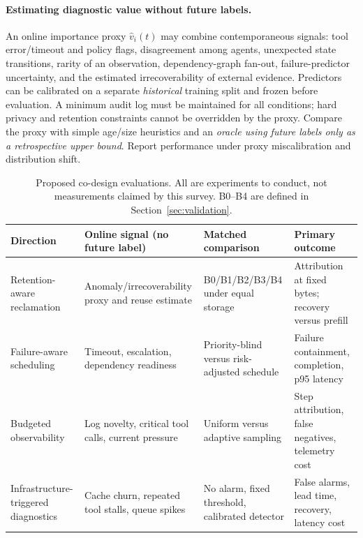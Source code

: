 \paragraph*{Estimating diagnostic value without future labels.} An online importance proxy $\hat v_i(t)$ may combine contemporaneous signals: tool error/timeout and policy flags, disagreement among agents, unexpected state transitions, rarity of an observation, dependency-graph fan-out, failure-predictor uncertainty, and the estimated irrecoverability of external evidence. Predictors can be calibrated on a separate \emph{historical} training split and frozen before evaluation. A minimum audit log must be maintained for all conditions; hard privacy and retention constraints cannot be overridden by the proxy. Compare the proxy with simple age/size heuristics and an \emph{oracle using future labels only as a retrospective upper bound}. Report performance under proxy miscalibration and distribution shift.

\begin{table}[t]
\centering
\caption{Proposed co-design evaluations. All are experiments to conduct, not measurements claimed by this survey. B0--B4 are defined in Section~\ref{sec:validation}.}
\label{tab:future_protocol}
\footnotesize
\begin{tabularx}{\textwidth}{@{}p{}p{}p{}X@{}}
\toprule
\textbf{Direction} & \textbf{Online signal (no future label)} & \textbf{Matched comparison} & \textbf{Primary outcome} \\
\midrule
Retention-aware reclamation & Anomaly/irrecoverability proxy and reuse estimate & B0/B1/B2/B3/B4 under equal storage & Attribution at fixed bytes; recovery versus prefill \\
Failure-aware scheduling & Timeout, escalation, dependency readiness & Priority-blind versus risk-adjusted schedule & Failure containment, completion, p95 latency \\
Budgeted observability & Log novelty, critical tool calls, current pressure & Uniform versus adaptive sampling & Step attribution, false negatives, telemetry cost \\
Infrastructure-triggered diagnostics & Cache churn, repeated tool stalls, queue spikes & No alarm, fixed threshold, calibrated detector & False alarms, lead time, recovery, latency cost \\
\bottomrule
\end{tabularx}
\end{table}

